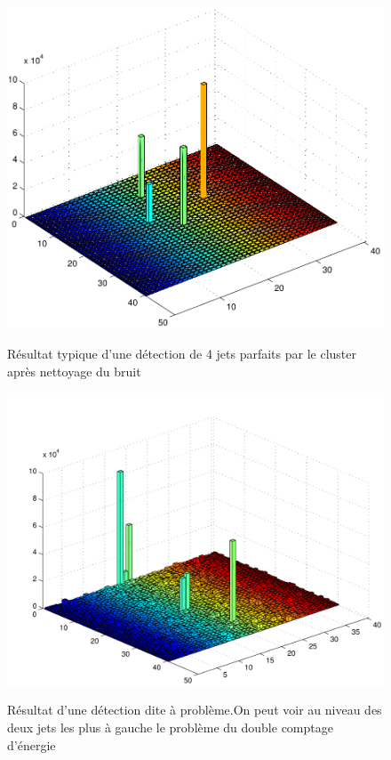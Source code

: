 \documentclass[11pt]{article}
\begin{document}
\begin{figure}
\caption{Résultat typique d'une détection de 4 jets parfaits par le cluster
après nettoyage du bruit}
\includegraphics[scale=0.55]{images/bonCasNet-eps-converted-to.pdf}
\label{bonp}
\end{figure}
\begin{figure}
\caption{Résultat d'une détection dite à problème.\newline On peut voir au
niveau des deux jets les plus à gauche le problème du double comptage d'énergie}
\includegraphics[scale=0.55]{images/mauvaisCasBrut-eps-converted-to.pdf}
\label{pasbonb}
\end{figure}
\end{document}
